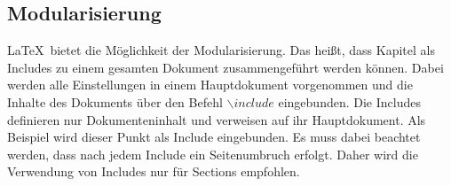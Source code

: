 

\subsection{Modularisierung}
\LaTeX \ bietet die Möglichkeit der Modularisierung. Das heißt, dass Kapitel als Includes zu einem gesamten Dokument zusammengeführt werden können. Dabei werden alle Einstellungen in einem Hauptdokument vorgenommen und die Inhalte des Dokuments über den Befehl $\backslash include$ eingebunden. Die Includes definieren nur Dokumenteninhalt und verweisen auf ihr Hauptdokument. Als Beispiel wird dieser Punkt als Include eingebunden. Es muss dabei beachtet werden, dass nach jedem Include ein Seitenumbruch erfolgt. Daher wird die Verwendung von Includes nur für Sections empfohlen.
